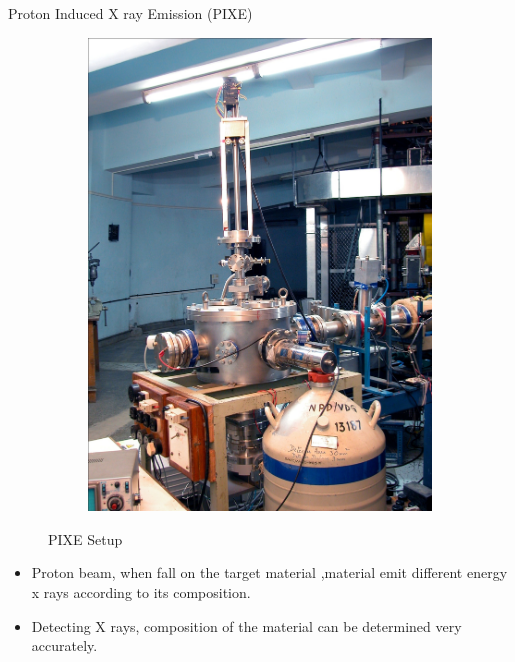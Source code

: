 \documentclass[11pt]{beamer}
\begin{document}
\begin{frame}{Proton Induced X ray Emission (PIXE)}

  \begin{figure}
        \centering
        \begin{subfigure}[b]{0.3\textwidth}
                \includegraphics[width=\textwidth]{Pixe_setup.jpg}
        \end{subfigure}%
               
        \caption{PIXE Setup}\label{fig:PIXE Setup}
\end{figure}
  
  
  \begin{itemize}
    
    \item Proton beam, when fall on the target material ,material  emit different energy x rays according to its composition. 
	\item Detecting X rays, composition of the material can be determined very accurately.
		           
   \end{itemize}


\end{frame}
\end{document}
